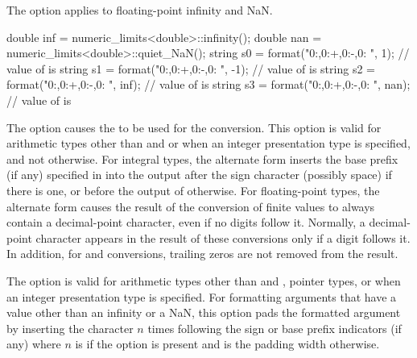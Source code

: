 \pnum
The  option applies to floating-point infinity and NaN.
\begin{example}
\begin{codeblock}
double inf = numeric_limits<double>::infinity();
double nan = numeric_limits<double>::quiet_NaN();
string s0 = format("{0:},{0:+},{0:-},{0: }", 1);        // value of  is 
string s1 = format("{0:},{0:+},{0:-},{0: }", -1);       // value of  is 
string s2 = format("{0:},{0:+},{0:-},{0: }", inf);      // value of  is 
string s3 = format("{0:},{0:+},{0:-},{0: }", nan);      // value of  is 
\end{codeblock}
\end{example}

\pnum
The \tcode{\#} option causes the
to be used for the conversion.
This option is valid for arithmetic types other than
 and 
or when an integer presentation type is specified, and not otherwise.
For integral types,
the alternate form inserts the
base prefix (if any) specified in 
into the output after the sign character (possibly space) if there is one, or
before the output of  otherwise.
For floating-point types,
the alternate form causes the result of the conversion of finite values
to always contain a decimal-point character,
even if no digits follow it.
Normally, a decimal-point character appears in the result of these
conversions only if a digit follows it.
In addition, for  and  conversions,
trailing zeros are not removed from the result.

\pnum
The  option is valid for arithmetic types
other than  and , pointer types, or
when an integer presentation type is specified.
For formatting arguments that have a value
other than an infinity or a NaN,
this option pads the formatted argument by
inserting the  character $n$ times
following the sign or base prefix indicators (if any)
where $n$ is  if the  option is present and
is the padding width otherwise.
\begin{example}
\end{example}

